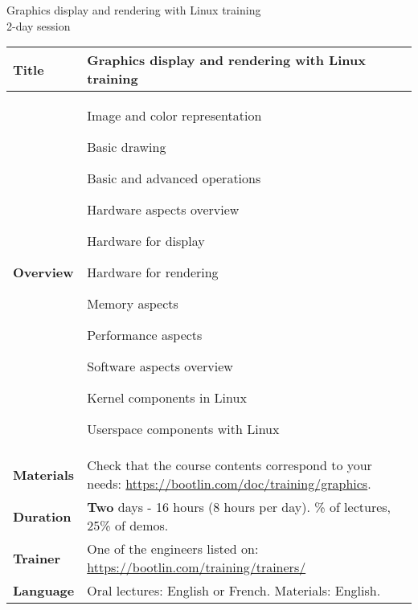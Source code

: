 \documentclass[a4paper,12pt,obeyspaces,spaces,hyphens]{article}
\begin{document}
\thispagestyle{fancy}

\setlength{\arrayrulewidth}{0.8pt}

\begin{center}
\LARGE
Graphics display and rendering with Linux training\\
\large
2-day session
\end{center}
\vspace{1cm}

\small
{}

 {
  \begin{tabularx}{\textwidth}{|g|h|}
    {\bf Title} & {\bf Graphics display and rendering with Linux training} \\
    \hline

    {\bf Overview} &
    Image and color representation \par
    Basic drawing \par
    Basic and advanced operations \par
    Hardware aspects overview \par
    Hardware for display \par
    Hardware for rendering \par
    Memory aspects \par
    Performance aspects \par
    Software aspects overview \par
    Kernel components in Linux \par
    Userspace components with Linux\\
    \hline
    {\bf Materials} &
    Check that the course contents correspond to your needs:
    \newline \url{https://bootlin.com/doc/training/graphics}. \\
    \hline

    {\bf Duration} & {\bf Two} days - 16 hours (8 hours per day).
    \% of lectures, 25\% of demos. \\
    \hline

    {\bf Trainer} & One of the engineers listed on:
    \newline \url{https://bootlin.com/training/trainers/}\\
    \hline

    {\bf Language} & Oral lectures: English or French.
    \newline Materials: English.\\
    \hline


\end{tabularx}}
\end{document}
